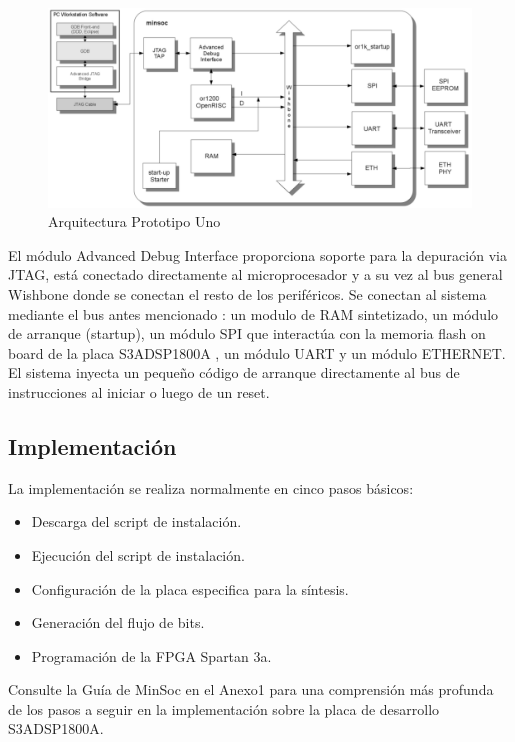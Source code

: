 		\begin{figure}[!h]
 		\begin{center}
  		\includegraphics[width=1\textwidth,keepaspectratio=true]{./images/minsoc}
  		\caption{Arquitectura Prototipo Uno}
  		\label{fig:minsoc}
 		\end{center}
		\end{figure}
		
		El módulo Advanced Debug Interface proporciona soporte para la depuración via JTAG, está conectado directamente al microprocesador y a su vez al bus
		general Wishbone donde se conectan el resto de los periféricos. Se conectan al sistema mediante el bus antes mencionado : un modulo	de RAM
		sintetizado, un módulo de arranque (startup), un módulo SPI que interactúa con la memoria flash on board de la placa S3ADSP1800A , un módulo UART y
		un módulo ETHERNET. El sistema inyecta un pequeño código de arranque directamente al bus de instrucciones al iniciar o luego de un reset. 
			
		\subsection{Implementación}
La implementación se realiza normalmente en cinco pasos básicos: 
\begin {itemize}
\item Descarga del script de instalación.
\item Ejecución del script de instalación.
\item Configuración de la placa especifica para la síntesis.
\item Generación del flujo de bits.
\item Programación de la FPGA Spartan 3a.
 \end {itemize}
 Consulte la Guía de MinSoc en el Anexo1 para una comprensión más profunda de los pasos a seguir en la implementación sobre la placa de desarrollo S3ADSP1800A.


